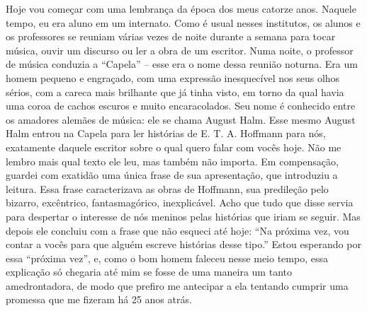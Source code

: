 Hoje vou começar com uma lembrança da época dos meus catorze anos.
Naquele tempo, eu era aluno em um internato. Como é usual nesses
institutos, os alunos e os professores se reuniam várias vezes de noite
durante a semana para tocar música, ouvir um discurso ou ler a obra de
um escritor. Numa noite, o professor de música conduzia a ``Capela'' --
esse era o nome dessa reunião noturna. Era um homem pequeno e engraçado,
com uma expressão inesquecível nos seus olhos sérios, com a careca mais
brilhante que já tinha visto, em torno da qual havia uma coroa de cachos
escuros e muito encaracolados. Seu nome é conhecido entre os amadores
alemães de música: ele se chama August Halm. Esse mesmo August Halm
entrou na Capela para ler histórias de E. T. A. Hoffmann para nós,
exatamente daquele escritor sobre o qual quero falar com vocês hoje. Não
me lembro mais qual texto ele leu, mas também não importa. Em
compensação, guardei com exatidão uma única frase de sua apresentação,
que introduziu a leitura. Essa frase caracterizava as obras de Hoffmann,
sua predileção pelo bizarro, excêntrico, fantasmagórico, inexplicável.
Acho que tudo que disse servia para despertar o interesse de nós meninos
pelas histórias que iriam se seguir. Mas depois ele concluiu com a frase
que não esqueci até hoje: ``Na próxima vez, vou contar a vocês para que
alguém escreve histórias desse tipo.'' Estou esperando por essa
``próxima vez'', e, como o bom homem faleceu nesse meio tempo, essa
explicação só chegaria até mim se fosse de uma maneira um tanto
amedrontadora, de modo que prefiro me antecipar a ela tentando cumprir
uma promessa que me fizeram há 25 anos atrás.

